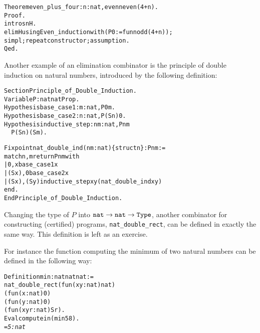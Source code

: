 \documentclass[11pt]{article}
\begin{document}
\begin{alltt}
Theorem even_plus_four : {\prodsym} n:nat, even n {\arrow} even (4+n).
Proof.
 intros n H.
 elim H using Even_induction with (P0 := fun n {\funarrow} odd (4+n));
 simpl;repeat constructor;assumption.
Qed.
\end{alltt}

Another example of an elimination combinator is the principle
of double induction on natural numbers, introduced by the following
definition:

\begin{alltt}
Section Principle_of_Double_Induction.
Variable    P              : nat {\arrow} nat {\arrow}Prop.
Hypothesis  base_case1     : {\prodsym} m:nat, P 0 m.
Hypothesis  base_case2     : {\prodsym} n:nat, P (S n) 0.
Hypothesis  inductive_step : {\prodsym} n m:nat, P n m {\arrow}
                                       \,\, P (S n) (S m).

Fixpoint nat_double_ind (n m:nat)\{struct n\} : P n m :=
 match n, m return P n m with
 |     0 ,    x   {\funarrow}  base_case1 x
 |  (S x),    0   {\funarrow} base_case2 x
 |  (S x), (S y) {\funarrow} inductive_step x y (nat_double_ind x y)
 end.
End Principle_of_Double_Induction.
\end{alltt}

Changing the type of $P$ into $\texttt{nat}\rightarrow\texttt{nat}\rightarrow\texttt{Type}$,
another combinator for constructing
(certified) programs, \texttt{nat\_double\_rect}, can be defined in exactly the same way.
This definition is left as an exercise.\label{natdoublerect}

\iffalse
\begin{alltt}
Section Principle_of_Double_Recursion.
Variable    P               : nat {\arrow} nat {\arrow} Type.
Hypothesis  base_case1      : {\prodsym} x:nat, P 0 x.
Hypothesis  base_case2      : {\prodsym} x:nat, P (S x) 0.
Hypothesis  inductive_step   : {\prodsym} n m:nat, P n m {\arrow} P (S n) (S m).
Fixpoint nat_double_rect (n m:nat)\{struct n\} : P n m :=
  match n, m return P n m with
            0 ,     x   {\funarrow}  base_case1 x
         |  (S x),    0   {\funarrow} base_case2 x
         |  (S x), (S y) {\funarrow} inductive_step x y (nat_double_rect x y)
     end.
End Principle_of_Double_Recursion.
\end{alltt}
\fi
For instance the function computing the minimum of two natural
numbers can be defined in the following way:

\begin{alltt}
Definition min : nat {\arrow} nat {\arrow} nat  :=
  nat_double_rect (fun (x y:nat) {\funarrow} nat)
                 (fun (x:nat) {\funarrow} 0)
                 (fun (y:nat) {\funarrow} 0)
                 (fun (x y r:nat) {\funarrow} S r).
Eval compute in (min 5 8).
\it
= 5 : nat
\end{alltt}
\end{document}
